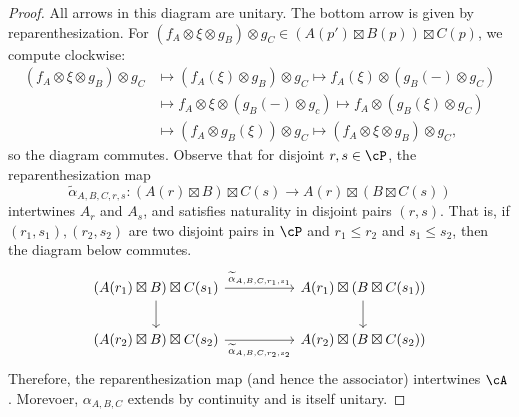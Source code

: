 \documentclass[11pt,reqno]{amsart}
\numberwithin{equation}{section}
\theoremstyle{plain}
\theoremstyle{definition}
\begin{document}
\begin{proof}
    All arrows in this diagram are unitary. The bottom arrow is given by reparenthesization. For $(f_A \otimes \xi \otimes g_B) \otimes g_C \in (A(p') \boxtimes B(p)) \boxtimes C(p)$, we compute clockwise:
    \begin{align*}
        (f_A \otimes \xi \otimes g_B) \otimes g_C &\mapsto (f_A(\xi) \otimes g_B) \otimes g_C \mapsto f_A(\xi) \otimes (g_B(-) \otimes g_C) \\
        &\mapsto f_A \otimes \xi \otimes (g_B(-)\otimes g_c) \mapsto f_A \otimes (g_B(\xi) \otimes g_C) \\
        &\mapsto (f_A \otimes g_B(\xi)) \otimes g_C \mapsto (f_A \otimes \xi \otimes g_B) \otimes g_C,
    \end{align*}
    so the diagram commutes. Observe that for disjoint $r,s\in\cP$, the reparenthesization map 
    \[
    \widetilde{\alpha}_{A,B,C,r,s}:(A(r)\boxtimes B)\boxtimes C(s)\to A(r)\boxtimes(B\boxtimes C(s))
    \]
    intertwines $A_r$ and $A_s$, and satisfies naturality in disjoint pairs $(r,s)$. That is, if $(r_1,s_1),(r_2,s_2)$ are two disjoint pairs in $\cP$ and $r_1\leq r_2$ and $s_1\leq s_2$, then the diagram below commutes.
    \[\begin{tikzcd}[column sep=2.5em, row sep=1em]
	{(A(r_1)\boxtimes B)\boxtimes C(s_1)} && {A(r_1)\boxtimes (B\boxtimes C(s_1))} \\
	\\
	{(A(r_2)\boxtimes B)\boxtimes C(s_2)} && {A(r_2)\boxtimes (B\boxtimes C(s_2))}
	\arrow["{\widetilde{\alpha}_{A,B,C,r_1,s_1}}", from=1-1, to=1-3]
	\arrow[from=1-1, to=3-1]
	\arrow[from=1-3, to=3-3]
	\arrow["{\widetilde{\alpha}_{A,B,C,r_2,s_2}}"', from=3-1, to=3-3]
\end{tikzcd}\]
Therefore, the reparenthesization map (and hence the associator) intertwines $\cA$. Morevoer, $\alpha_{A,B,C}$ extends by continuity and is itself unitary.


\end{proof}
\end{document}
